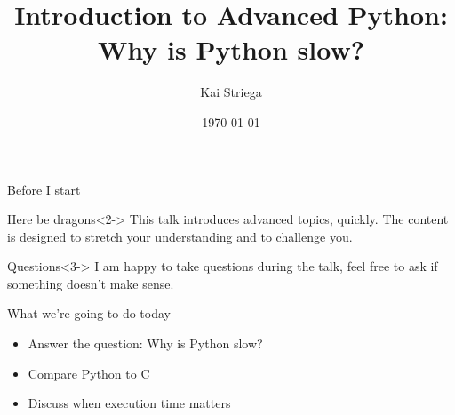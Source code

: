 \documentclass[12pt, aspectration=169]{beamer}
\title{Introduction to Advanced Python:\\Why is Python slow?}
\author{Kai Striega}
\date{\today}
\begin{document}
    \maketitle

    \begin{frame}{Before I start}
        \begin{block}{Here be dragons}<2->
            This talk introduces advanced topics, quickly.
            The content is designed to stretch your understanding and to challenge you.
        \end{block}
        \begin{block}{Questions}<3->
            I am happy to take questions during the talk, feel free to ask if something doesn't make sense.
        \end{block}
    \end{frame}

    \begin{frame}{What we're going to do today}
        \begin{itemize}
            \item Answer the question: Why is Python slow?
            \item Compare Python to C
            \item Discuss when execution time matters
        \end{itemize}
    \end{frame}
\end{document}
